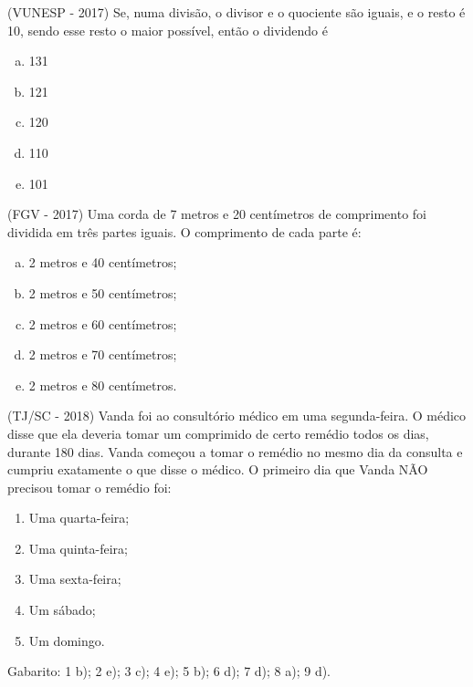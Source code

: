  \begin{exer}
 (VUNESP - 2017) Se, numa divisão, o divisor e o quociente são iguais, e o resto é 10, sendo esse resto o maior possível, então o dividendo é
  \begin{enumerate}[a)]
  \item 131
  \item 121
  \item 120
  \item 110
  \item 101
  \end{enumerate}
 \end{exer}
 
 \begin{exer}
 (FGV - 2017) Uma corda de 7 metros e 20 centímetros de comprimento foi dividida em três partes iguais. O comprimento de cada parte é:

  \begin{enumerate}[a)]
  \item 2 metros e 40 centímetros;
  \item 2 metros e 50 centímetros;
  \item 2 metros e 60 centímetros;
  \item 2 metros e 70 centímetros;
  \item 2 metros e 80 centímetros.
  \end{enumerate}
 \end{exer}
 
 \begin{exer}
 (TJ/SC - 2018) Vanda foi ao consultório médico em uma segunda-feira. O médico disse que ela deveria tomar um comprimido de certo remédio todos os dias, durante 180 dias. Vanda começou a tomar o remédio no mesmo dia da consulta e cumpriu exatamente o que disse o médico.
  O primeiro dia que Vanda NÃO precisou tomar o remédio foi:
  \begin{enumerate}
  \item Uma quarta-feira;
  \item Uma quinta-feira;
  \item Uma sexta-feira;
  \item Um sábado;
  \item Um domingo.
 \end{enumerate}
 \end{exer}
 
  Gabarito: 1 b); 2 e); 3 c); 4 e); 5 b); 6 d); 7 d); 8 a); 9 d).
